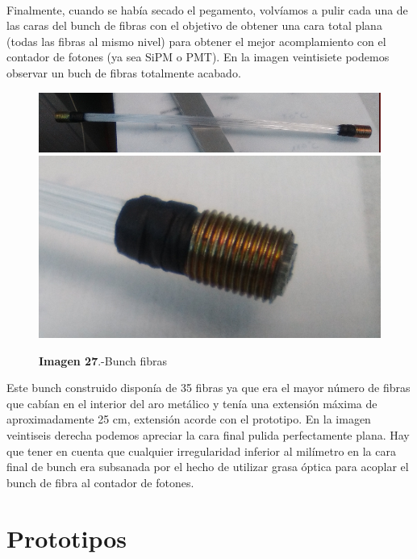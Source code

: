 \documentclass[11pt, a4paper]{article}
\begin{document}
\paragraph {}
Finalmente, cuando se había secado el pegamento, volvíamos a pulir cada una de las caras del bunch de fibras con el objetivo de obtener una cara total plana (todas las fibras al mismo nivel) para obtener el mejor acomplamiento con el contador de fotones (ya sea SiPM o PMT). En la imagen veintisiete podemos observar un buch de fibras totalmente acabado.

\begin{figure}[htb]
\centering
{
\includegraphics[scale=0.2]{bunchfibras.png} 
}
{
\includegraphics[scale=0.2]{bunchfibras1.png} 
}
\caption{\textbf{Imagen 27}.-Bunch fibras}
\end{figure} 

Este bunch construido disponía de 35 fibras ya que era el mayor número de fibras que cabían en el interior del aro metálico y tenía una extensión máxima de aproximadamente 25 cm, extensión acorde con el prototipo. En la imagen veintiseis derecha podemos apreciar la cara final pulida perfectamente plana. Hay que tener en cuenta que cualquier irregularidad inferior al milímetro en la cara final de bunch era subsanada por el hecho de utilizar grasa óptica para acoplar el bunch de fibra al contador de fotones.



\section {Prototipos} 
\end{document}
